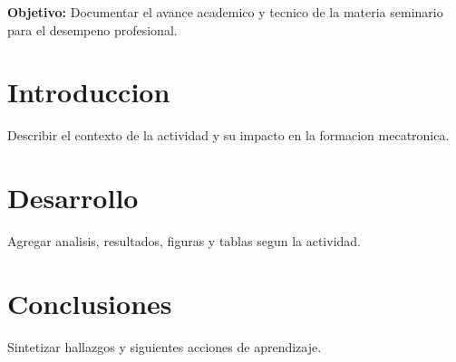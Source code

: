 \documentclass[spanish,letterpaper,oneside]{article}
\begin{document}
\templatePortrait
\templatePagecfg
\onehalfspacing

\begin{abstractd}
\textbf{Objetivo:} Documentar el avance academico y tecnico de la materia seminario para el desempeno profesional.
\end{abstractd}

\templateIndex
\templateFinalcfg

\section{Introduccion}
Describir el contexto de la actividad y su impacto en la formacion mecatronica.

\section{Desarrollo}
Agregar analisis, resultados, figuras y tablas segun la actividad.

\section{Conclusiones}
Sintetizar hallazgos y siguientes acciones de aprendizaje.



\end{document}
